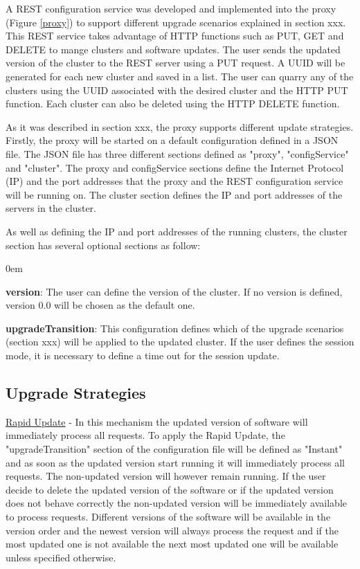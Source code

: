 \documentclass[a4paper,11pt,twoside]{article}
\begin{document}
A REST configuration service was developed and implemented into the proxy (Figure \ref{proxy}) to support different upgrade scenarios explained in section xxx. This REST service takes advantage of HTTP functions such as PUT, GET and DELETE to mange clusters and software updates. The user sends the updated version of the cluster to the REST server using a PUT request. A UUID will be generated for each new cluster and saved in a list. The user can quarry any of the clusters using the UUID associated with the desired cluster and the HTTP PUT function. Each cluster can also be deleted using the HTTP DELETE function. 

As it was described in section xxx, the proxy supports different update strategies. Firstly, the proxy will be started on a default configuration defined in a JSON file. The JSON file has three different sections defined as "proxy", "configService" and "cluster". The proxy and configService sections define the Internet Protocol (IP) and the port addresses that the proxy and the REST configuration service will be running on. The cluster section defines the IP and port addresses of the servers in the cluster. 

As well as defining the IP and port addresses of the running clusters, the cluster section has several optional sections as follow:

\begin{list}{-}{}
  \itemsep0em
  \item \textbf{version}: The user can define the version of the cluster. If  no version is defined, version 0.0 will be chosen as the default one.      

  \item \textbf{upgradeTransition}: This configuration defines which of the upgrade scenarios (section xxx) will be applied to the updated cluster. If the user defines the session mode, it is necessary to define a time out for the session update.
\end{list}

\subsection{Upgrade Strategies}
\underline{Rapid Update} - In this mechanism the updated version of software will immediately process all requests. To apply the Rapid Update, the "upgradeTransition" section of the configuration file will be defined as "Instant" and as soon as the updated version start running it will immediately process all requests. The non-updated version will however remain running. If the user decide to delete the updated version of the software or if the updated version does not behave correctly the non-updated version will be immediately available to process requests. Different versions of the software will be available in the version order and the newest version will always process the request and if the most updated one is not available the next most updated one will be available unless specified otherwise.  
\end{document}
